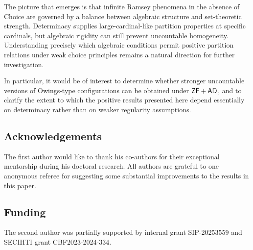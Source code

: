 \documentclass[10pt,a4paper]{amsart}
\theoremstyle{definition}
\newcommand{\zf}{\mathnormal{\mathsf{ZF}}}
\newcommand{\ad}{\mathnormal{\mathsf{AD}}}
\theoremstyle{remark}
\numberwithin{equation}{section}
\begin{document}
The picture that emerges is that infinite Ramsey phenomena in the absence of Choice are governed by a balance between algebraic structure and set-theoretic strength. 
Determinacy supplies large-cardinal-like partition properties at specific cardinals, but algebraic rigidity can still prevent uncountable homogeneity. 
Understanding precisely which algebraic conditions permit positive partition relations under weak choice principles remains a natural direction for further investigation.

In particular, it would be of interest to determine whether stronger uncountable versions of Owings-type configurations can be obtained under $\zf+\ad$, and to clarify the extent to which the positive results presented here depend essentially on determinacy rather than on weaker regularity assumptions.

\subsection*{Acknowledgements}
The first author would like to thank his co-authors for their exceptional mentorship during his doctoral research. All authors are grateful to one anonymous referee for suggesting some substantial improvements to the results in this paper.

\subsection* {Funding}
The second author was partially supported by internal grant SIP-20253559 and SECIHTI grant CBF2023-2024-334.




\end{document}
